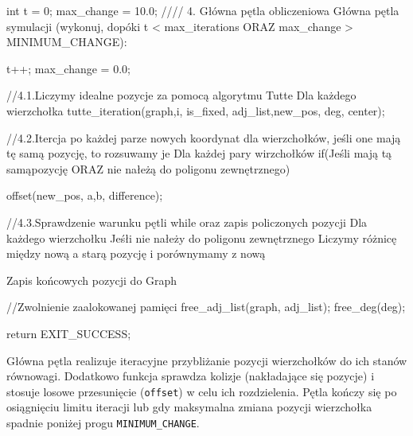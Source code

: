\documentclass[]{article}
\begin{document}
\begin{mylisting}


    int t = 0;
    max_change = 10.0;
    //// 4. Główna pętla obliczeniowa
    Główna pętla symulacji (wykonuj, dopóki t < max_iterations ORAZ max_change > MINIMUM_CHANGE):

        t++; 
        max_change = 0.0;
        
        //4.1.Liczymy idealne pozycje za pomocą algorytmu Tutte
        Dla każdego wierzchołka
            tutte_iteration(graph,i, is_fixed, adj_list,new_pos, deg, center);

        //4.2.Itercja po każdej parze nowych koordynat dla wierzchołków, jeśli one mają tę samą pozycję, to rozsuwamy je
                Dla każdej pary wirzchołków
                        if(Jeśli mają tą samąpozycję ORAZ nie nałeżą do poligonu zewnętrznego){
                            offset(new_pos, a,b, difference);

        //4.3.Sprawdzenie warunku pętli while oraz zapis policzonych pozycji
        Dla każdego wierzchołku
            Jeśłi nie nałeży do poligonu zewnętrznego
                Liczymy różnicę między nową a starą pozycję i porównymamy z nową 

                Zapis końcowych pozycji do Graph
               

            
    //Zwolnienie zaalokowanej pamięci
    free_adj_list(graph, adj_list);
    free_deg(deg);


    return EXIT_SUCCESS;
}
\end{mylisting}
Główna pętla realizuje iteracyjne przybliżanie pozycji wierzchołków do ich stanów równowagi. Dodatkowo funkcja sprawdza kolizje (nakładające się pozycje) i stosuje losowe przesunięcie (\texttt{offset}) w celu ich rozdzielenia. Pętla kończy się po osiągnięciu limitu iteracji lub gdy maksymalna zmiana pozycji wierzchołka spadnie poniżej progu \texttt{MINIMUM\_CHANGE}.
\end{document}
